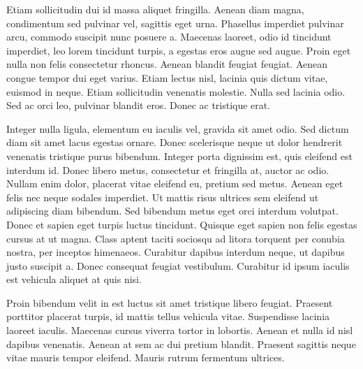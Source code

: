 Etiam sollicitudin dui id massa aliquet fringilla. Aenean diam magna, condimentum sed pulvinar vel, sagittis eget urna. Phasellus imperdiet pulvinar arcu, commodo suscipit nunc posuere a. Maecenas laoreet, odio id tincidunt imperdiet, leo lorem tincidunt turpis, a egestas eros augue sed augue. Proin eget nulla non felis consectetur rhoncus. Aenean blandit feugiat feugiat. Aenean congue tempor dui eget varius. Etiam lectus nisl, lacinia quis dictum vitae, euismod in neque. Etiam sollicitudin venenatis molestie. Nulla sed lacinia odio. Sed ac orci leo, pulvinar blandit eros. Donec ac tristique erat.

Integer nulla ligula, elementum eu iaculis vel, gravida sit amet odio. Sed dictum diam sit amet lacus egestas ornare. Donec scelerisque neque ut dolor hendrerit venenatis tristique purus bibendum. Integer porta dignissim est, quis eleifend est interdum id. Donec libero metus, consectetur et fringilla at, auctor ac odio. Nullam enim dolor, placerat vitae eleifend eu, pretium sed metus. Aenean eget felis nec neque sodales imperdiet. Ut mattis risus ultrices sem eleifend ut adipiscing diam bibendum. Sed bibendum metus eget orci interdum volutpat. Donec et sapien eget turpis luctus tincidunt. Quisque eget sapien non felis egestas cursus at ut magna. Class aptent taciti sociosqu ad litora torquent per conubia nostra, per inceptos himenaeos. Curabitur dapibus interdum neque, ut dapibus justo suscipit a. Donec consequat feugiat vestibulum. Curabitur id ipsum iaculis est vehicula aliquet at quis nisi.

Proin bibendum velit in est luctus sit amet tristique libero feugiat. Praesent porttitor placerat turpis, id mattis tellus vehicula vitae. Suspendisse lacinia laoreet iaculis. Maecenas cursus viverra tortor in lobortis. Aenean et nulla id nisl dapibus venenatis. Aenean at sem ac dui pretium blandit. Praesent sagittis neque vitae mauris tempor eleifend. Mauris rutrum fermentum ultrices. 


